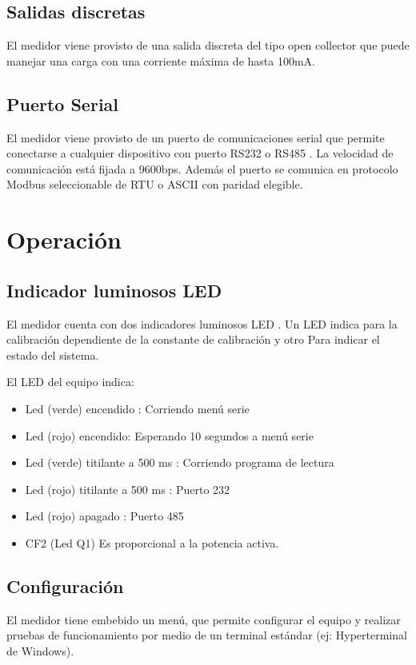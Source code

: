 \subsection{Salidas discretas}
El medidor viene provisto de una salida discreta del tipo open collector que puede manejar una carga con una corriente máxima de hasta 100mA.

\subsection{Puerto Serial}
El medidor viene provisto de un puerto de comunicaciones serial que permite conectarse a cualquier dispositivo con puerto RS232 o RS485 .
La velocidad de comunicación  está fijada a 9600bps. Además el puerto se comunica en protocolo Modbus seleccionable de RTU o ASCII con paridad elegible.

\section{Operación}

\subsection{Indicador luminosos LED}

El medidor cuenta con dos indicadores luminosos LED . Un LED indica para la calibración dependiente de la constante de calibración y otro Para indicar el estado del sistema.


El LED del equipo indica:

\begin{itemize}
\item Led (verde) encendido : Corriendo menú serie
\item Led (rojo) encendido: Esperando 10 segundos a menú serie
\item Led (verde) titilante  a 500 ms : Corriendo programa de lectura
\item Led (rojo) titilante  a 500 ms : Puerto 232
\item Led (rojo) apagado : Puerto 485
\item CF2 (Led Q1)  Es proporcional a la potencia activa.
\end{itemize}


\subsection{Configuración}
El medidor tiene embebido un menú, que permite configurar el equipo y realizar pruebas de funcionamiento por medio de un terminal estándar (ej: Hyperterminal de Windows).

